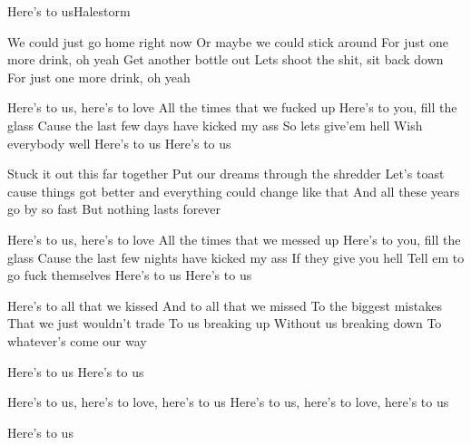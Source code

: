 \begin{Song}{Here's to us}{Halestorm}
\begin{multicols}{2}

\begin{Verse}
We could just go home right now
Or maybe we could stick around
For just one more drink, oh yeah
Get another bottle out
Lets shoot the shit, sit back down
For just one more drink, oh yeah
\end{Verse}
\espaceInterStrophe

\begin{Chorus}
Here's to us, here's to love
All the times that we fucked up
Here's to you, fill the glass
Cause the last few days have kicked my ass
So lets give'em hell
Wish everybody well
Here's to us
Here's to us
\end{Chorus}
\espaceInterStrophe

\begin{Verse}
Stuck it out this far together
Put our dreams through the shredder
Let’s toast cause things got better
and everything could change like that
And all these years go by so fast
But nothing lasts forever
\end{Verse}
\vfill
\columnbreak

\begin{Chorus}
Here's to us, here's to love
All the times that we messed up
Here's to you, fill the glass
Cause the last few nights have kicked my ass
If they give you hell
Tell em to go fuck themselves
Here's to us
Here's to us
\end{Chorus}
\espaceInterStrophe

\begin{Bridge}
Here's to all that we kissed
And to all that we missed
To the biggest mistakes
That we just wouldn’t trade
To us breaking up
Without us breaking down
To whatever's come our way
\end{Bridge}
\espaceInterStrophe

\tochorus[1]

\tochorus[2]

\begin{Chorus}
Here's to us
Here's to us

Here’s to us, here’s to love, here’s to us
Here’s to us, here’s to love, here’s to us

Here’s to us
\end{Chorus}

\end{multicols}


\end{Song}
